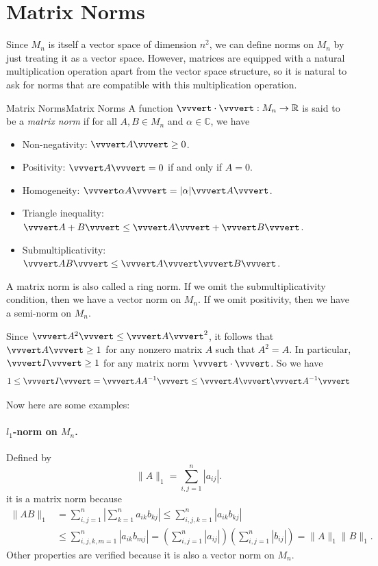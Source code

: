 \documentclass[../main.tex]{subfiles}
\begin{document}
\section{Matrix Norms}
Since $M_n$ is itself a vector space of dimension $n^2$, we can define norms on $M_n$ by just treating it as a vector space. However, matrices are equipped with a natural multiplication operation apart from the vector space structure, so it is natural to ask for norms that are compatible with this multiplication operation.

\begin{definition}{Matrix Norms}{Matrix Norms}
  A function $\vvvert\cdot\vvvert: M_n \to \mathbb{R}$ is said to be a \textit{matrix norm} if for all $A, B \in M_n$ and $\alpha \in \mathbb{C}$, we have
  \begin{itemize}
    \item Non-negativity: $\vvvert A \vvvert \geq 0$.
    \item Positivity: $\vvvert A \vvvert = 0$ if and only if $A = 0$.
    \item Homogeneity: $\vvvert \alpha A \vvvert = |\alpha| \vvvert A \vvvert$.
    \item Triangle inequality: $\vvvert A + B \vvvert \leq \vvvert A \vvvert + \vvvert B \vvvert$.
    \item Submultiplicativity: $\vvvert AB \vvvert \leq \vvvert A \vvvert \vvvert B \vvvert$.
  \end{itemize}
  A matrix norm is also called a ring norm. If we omit the submultiplicativity condition, then we have a vector norm on $M_n$. If we omit positivity, then we have a semi-norm on $M_n$.
\end{definition}

Since $\vvvert A^2 \vvvert \leq \vvvert A \vvvert^2$, it follows that $\vvvert A \vvvert \geq 1$ for any nonzero matrix $A$ such that $A^2 = A$. In particular, $\vvvert I \vvvert \geq 1$ for any matrix norm $\vvvert\cdot\vvvert$. So we have
\begin{equation}
  1 \leq \vvvert I \vvvert = \vvvert A A^{-1} \vvvert \leq \vvvert A \vvvert \vvvert A^{-1} \vvvert
\end{equation}

Now here are some examples:
\paragraph{$l_1$-norm on $M_n$. } Defined by
\begin{equation*}
  \| A \|_1 = \sum_{i,j=1}^n |a_{ij}|.
\end{equation*}
it is a matrix norm because
\begin{equation*}
  \begin{aligned}
    \| AB \|_1 & = \sum_{i,j=1}^n \left| \sum_{k=1}^n a_{ik} b_{kj} \right| \leq \sum_{i,j,k=1}^n |a_{ik} b_{kj}| \\
    & \leq \sum_{i,j,k,m=1}^n |a_{ik} b_{mj}| = \left( \sum_{i,j=1}^n |a_{ij}| \right) \left( \sum_{i,j=1}^n |b_{ij}| \right) = \| A \|_1 \| B \|_1.
  \end{aligned}
\end{equation*}
Other properties are verified because it is also a vector norm on $M_n$.
\end{document}
